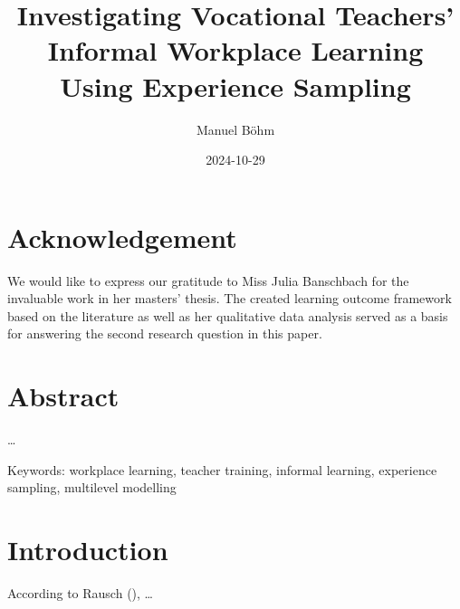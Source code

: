 \documentclass[
]{article}
\title{Investigating Vocational Teachers' Informal Workplace Learning
Using Experience Sampling}
\author{Manuel Böhm}
\date{2024-10-29}
\begin{document}
\maketitle

\renewcommand*\contentsname{Article Outline}
{
\setcounter{tocdepth}{2}
\tableofcontents
}
\newpage
{}

\section*{Acknowledgement}\label{acknowledgement}

We would like to express our gratitude to Miss Julia Banschbach for the
invaluable work in her masters' thesis. The created learning outcome
framework based on the literature as well as her qualitative data
analysis served as a basis for answering the second research question in
this paper.

\newpage

\section*{Abstract}\label{abstract}

\ldots{}

Keywords: workplace learning, teacher training, informal learning,
experience sampling, multilevel modelling

\newpage

\section{Introduction}\label{introduction}

According to Rausch
(), \ldots{}
\end{document}
